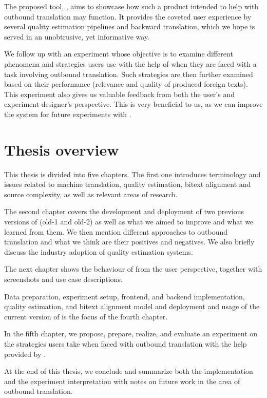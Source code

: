 The proposed tool, \ptakopet{}, aims to showcase how such a product intended to help with outbound translation may function. It provides the coveted user experience by several quality estimation pipelines and backward translation, which we hope is served in an unobtrusive, yet informative way.

We follow up with an experiment whose objective is to examine different phenomena and strategies users use with the help of \ptakopet{} when they are faced with a task involving outbound translation. Such strategies are then further examined based on their performance (relevance and quality of produced foreign texts). This experiment also gives us valuable feedback from both the user's and experiment designer's perspective. This is very beneficial to us, as we can improve the system for future experiments with \ptakopet{}.

\section*{Thesis overview}
This thesis is divided into five chapters. The first one introduces terminology and issues related to machine translation, quality estimation, bitext alignment and source complexity, as well as relevant areas of research.

The second chapter covers the development and deployment of two previous versions of \ptakopet{} (old-1 and old-2) as well as what we aimed to improve and what we learned from them. We then mention different approaches to outbound translation and what we think are their positives and negatives. We also briefly discuss the industry adoption of quality estimation systems.

The next chapter shows the behaviour of \ptakopet{} from the user perspective, together with screenshots and use case descriptions.

Data preparation, experiment setup, frontend, and backend implementation, quality estimation, and bitext alignment model and deployment and usage of the current version of \ptakopet{} is the focus of the fourth chapter.

In the fifth chapter, we propose, prepare, realize, and evaluate an experiment on the strategies users take when faced with outbound translation with the help provided by \ptakopet{}. 

At the end of this thesis, we conclude and summarize both the \ptakopet{} implementation and the experiment interpretation with notes on future work in the area of outbound translation.
